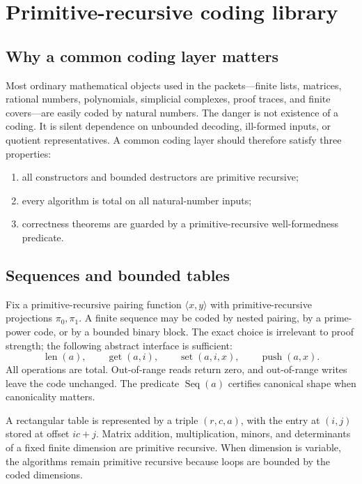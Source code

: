 \section{Primitive-recursive coding library}

\subsection{Why a common coding layer matters}

Most ordinary mathematical objects used in the packets---finite lists,
matrices, rational numbers, polynomials, simplicial complexes, proof traces,
and finite covers---are easily coded by natural numbers.  The danger is not
existence of a coding.  It is silent dependence on unbounded decoding,
ill-formed inputs, or quotient representatives.  A common coding layer should
therefore satisfy three properties:
\begin{enumerate}
\item all constructors and bounded destructors are primitive recursive;
\item every algorithm is total on all natural-number inputs;
\item correctness theorems are guarded by a primitive-recursive well-formedness
predicate.
\end{enumerate}

\subsection{Sequences and bounded tables}

Fix a primitive-recursive pairing function
\(\langle x,y\rangle\) with primitive-recursive projections
\(\pi_0,\pi_1\).  A finite sequence may be coded by nested pairing, by a prime-
power code, or by a bounded binary block.  The exact choice is irrelevant to
proof strength; the following abstract interface is sufficient:
\[
\operatorname{len}(a),\qquad
\operatorname{get}(a,i),\qquad
\operatorname{set}(a,i,x),\qquad
\operatorname{push}(a,x).
\]
All operations are total.  Out-of-range reads return zero, and out-of-range
writes leave the code unchanged.  The predicate \(\operatorname{Seq}(a)\)
certifies canonical shape when canonicality matters.

A rectangular table is represented by a triple \((r,c,a)\), with the entry at
\((i,j)\) stored at offset \(ic+j\).  Matrix addition, multiplication, minors,
and determinants of a fixed finite dimension are primitive recursive.  When
dimension is variable, the algorithms remain primitive recursive because
loops are bounded by the coded dimensions.

